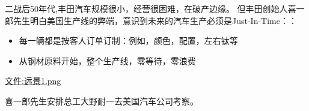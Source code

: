 二战后50年代,丰田汽车规模很小，经营很困难，在破产边缘。
但丰田创始人喜一郎先生明白美国生产线的弊端，意识到未来的汽车生产必须是Just-In-Time：：

\begin{itemize}
\tightlist
\item
  每一辆都是按客人订单订制：例如，颜色，配置，左右钛等
\item
  从钢材原料开始，整个生产线，零等待，零浪费
\end{itemize}

\begin{description}
\item[]
\end{description}

\url{文件:远景1.png}

喜一郎先生安排总工大野耐一去美国汽车公司考察。


